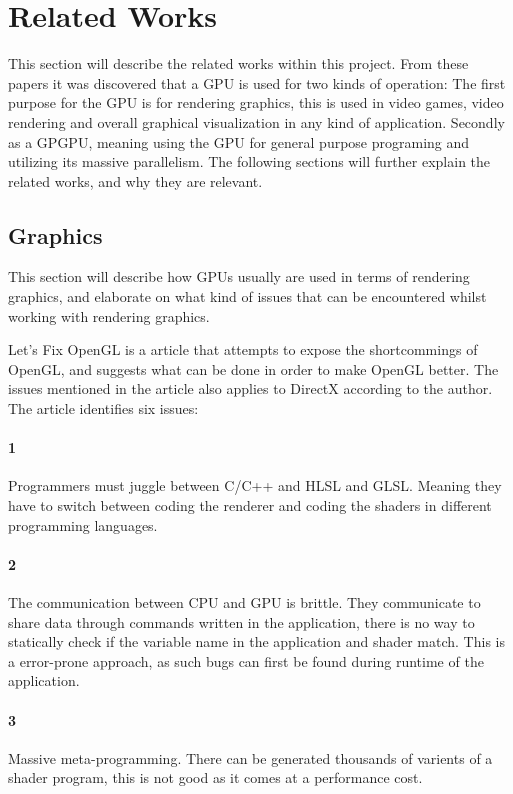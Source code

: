 \section{Related Works}\label{sec:related_works}
This section will describe the related works within this project.
From these papers it was discovered that a \gls{GPU} is used for two kinds of operation: 
The first purpose for the \gls{GPU} is for rendering graphics, this is used in video games, video rendering and overall graphical visualization in any kind of application. 
Secondly as a GP\gls{GPU}, meaning using the \gls{GPU} for general purpose programing and utilizing its massive parallelism.
The following sections will further explain the related works, and why they are relevant.

\subsection{Graphics}
This section will describe how \glspl{GPU} usually are used in terms of rendering graphics, and elaborate on what kind of issues that can be encountered whilst working with rendering graphics.

Let's Fix OpenGL \cite{fix_opengl} is a article that attempts to expose the shortcommings of OpenGL, and suggests what can be done in order to make OpenGL better. 
The issues mentioned in the article also applies to DirectX according to the author. 
The article identifies six issues: 

\paragraph{1} Programmers must juggle between C/C++ and HLSL and GLSL.
Meaning they have to switch between coding the renderer and coding the shaders in different programming languages.

\paragraph{2} The communication between CPU and \gls{GPU} is brittle. 
They communicate to share data through commands written in the application, there is no way to statically check if the variable name in the application and shader match.
This is a error-prone approach, as such bugs can first be found during runtime of the application.

\paragraph{3} Massive meta-programming. 
There can be generated thousands of varients of a shader program, this is not good as it comes at a performance cost.

